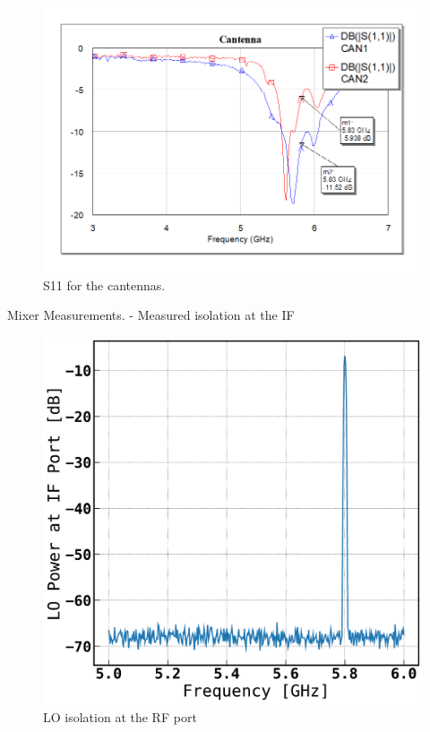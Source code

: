 \documentclass[reprint, aps, prl]{revtex4-1}
\begin{document}
\begin{figure}[!htbp]
    \centering
    \includegraphics[scale=0.35]{Cantenna_S11.png}
    \caption{S11 for the cantennas.}
    \label{fig:cantennaS11}
\end{figure}

Mixer Measurements.
- Measured isolation at the IF


\begin{figure}[!htbp]
    \centering
    \includegraphics[scale=0.35]{Mixer_LO.pdf}
    \caption{LO isolation at the RF port}
    \label{fig:mixerLO}
\end{figure}
\end{document}
